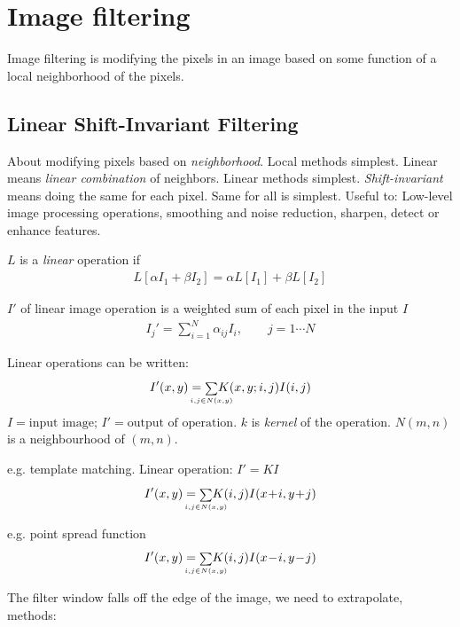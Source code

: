 \chapter{Image filtering}
Image filtering is modifying the pixels in an image based on some function of a local neighborhood of the pixels.
\section{Linear Shift-Invariant Filtering}
About modifying pixels based on \emph{neighborhood}. Local methods simplest. Linear means \emph{linear combination} of neighbors. Linear methods simplest. \emph{Shift-invariant} means doing the same for each pixel. Same for all is simplest. Useful to: Low-level image processing operations, smoothing and noise reduction, sharpen, detect or enhance features.
\begin{compactdesc}
	\item[\lp{Linear operation}] $L$ is a \emph{linear} operation if 
		\begin{gather*}
			L\!\left[ \alpha I_1+\beta I_2 \right]=\alpha L[I_1]+\beta L[I_2]
		\end{gather*}
	\item[\lp{Output}] $I'$ of linear image operation is a weighted sum of each pixel in the input $I$
		\begin{gather*}
			I_j'={\scriptstyle \sum_{i=1}^{N}}\alpha_{ij}I_i,\qquad j=1\cdots N
		\end{gather*}
	\item[\lp{Linear Filtering}] Linear operations can be written:
		\begin{align*}
			I'(x,y)={\scriptstyle\sum\limits_{\mathclap{i,j\in N(x,y)}}^{}}K(x,y;i,j)I(i,j)
		\end{align*}
		$I=\text{input image}$; $I'=\text{output of operation}$. $k$ is \emph{kernel} of the operation. $N(m,n)$ is a neighbourhood of $(m,n)$.
	\item[\lp{Correlation}] e.g. template matching. Linear operation: $I'=KI$ 
		\begin{gather*}
			I'(x,y)={\scriptstyle \sum\limits_{\mathclap{i,j\in N(x,y)}}^{}}K(i,j)I(x\!+\!i,y\!+\!j)
		\end{gather*}
	\item[\lp{Convolution}] e.g. point spread function
		\begin{align*}
			I'(x,y)={\scriptstyle\sum\limits_{\mathclap{i,j\in N(x,y)}}^{}} K(i,j)I(x\!-\!i,y\!-\!j)
		\end{align*}
	\item[\lp{Edge}] The filter window falls off the edge of the image, we need to extrapolate, methods:\\

\end{compactdesc}
